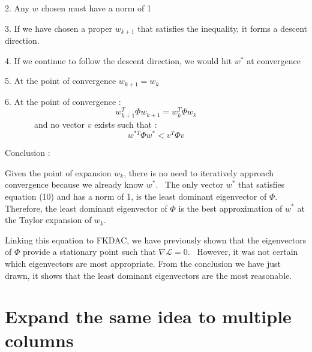 \documentclass{article}
\begin{document}
2. Any $w_{}$ chosen must have a norm of 1

3. If we have chosen a proper $w_{k + 1}$ that satisfies the inequality, it
forms a descent direction.

4. If we continue to follow the descent direction, we would hit $w^{\ast}$ at
convergence

5. At the point of convergence $w_{k + 1} = w_k$

6. At the point of convergence :
\begin{equation}
  w_{k + 1}^T \Phi w_{k + 1} = w_k^T \Phi w_k
\end{equation}
\ \ \ \ \ \ \ and no vector $v$ exists such that :
\begin{equation}
  w^{\ast T} \Phi w^{\ast} < v^T \Phi v
\end{equation}


Conclusion :



Given the point of expansion $w_k$, there is no need to iteratively approach
convergence because we already know $w^{\ast}$. \ The only vector $w^{\ast}$
that satisfies equation (10) and has a norm of 1, is the least dominant
eigenvector of $\Phi$. Therefore, the least dominant eigenvector of $\Phi$ is
the best approximation of $w^{\ast}$ at the Taylor expansion of $w_k$.



Linking this equation to FKDAC, we have previously shown that the eigenvectors
of $\Phi$ provide a stationary point such that $\nabla \mathcal{L}= 0$. \
However, it was not certain which eigenvectors are most appropriate. From the
conclusion we have just drawn, it shows that the least dominant eigenvectors
are the most reasonable.



\section{Expand the same idea to multiple columns}
\end{document}
